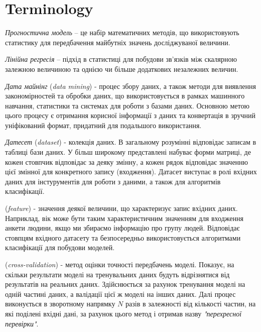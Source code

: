 \section{Terminology}
\textit{Прогностична модель} – це набір математичних методів, що використовують статистику для передбачення майбутніх значень досліджуваної величини. 

\textit{Лінійна регресія} – підхід в статистиці для побудови зв’язків між скалярною залежною величиною та однією чи більше додаткових незалежних величин.

\textit{Дата майнінг} (\textit{data mining}) - процес збору даних, а також методи для виявлення закономірностей та обробки даних, що використовується в рамках машинного навчання, статистики та системах для роботи з базами даних. Основною метою цього процесу є отримання корисної інформації з даних та конвертація в зручний уніфікований формат, придатний для подальшого використання.

\textit{Датесет} (\textit{dataset}) - колекція даних. В загальному розумінні відповідає записам в таблиці бази даних. У більш широкому представлені набуває форми матриці, де кожен стовпчик відповідає за деяку змінну, а кожен рядок відповідає значенню цієї змінної для конкретного запису (входження). Датасет виступає в ролі вхідних даних для інстурументів для роботи з даними, а також для алгоритмів класифікації. 

 (\textit{feature}) - значення деякої величини, що характеризує запис вхідних даних. Наприклад, вік може бути таким характеристичним значенням для входження анкети людини, якщо ми збираємо інформацію про групу людей. Відповідає стовпцям вхідного датасету та безпосередньо використовується алгоритмами класифікації для побудови моделей.

 (\textit{cross-validation}) - метод оцінки точності передбачень моделі. Показує, на скільки результати моделі на тренувальних даних будуть відрізнятися від результатів на реальних даних. Здійснюється за рахунок тренування моделі на одній частині даних, а валідації цієї ж моделі на інших даних. Далі процес виконується в зворотному напрямку $N$ разів в залежності від кількості частин, на які поділені вхідні дані, за рахунок цього метод і отримав назву \textit{"перехресної перевірки"}.
